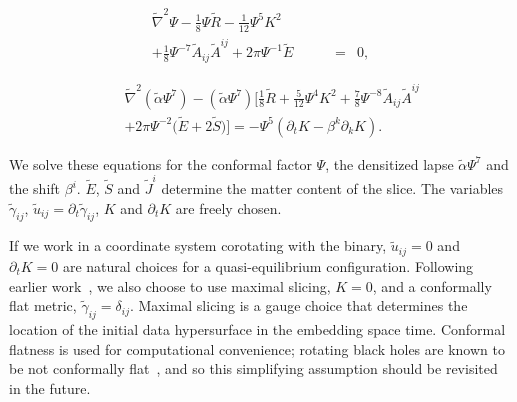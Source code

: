 {\begin{eqnarray}
\tilde{\nabla}^2\Psi - \frac{1}{8}\Psi\tilde{R} -
\frac{1}{12}\Psi^5K^2  \qquad\quad && \nonumber \\
\label{eq:XCTS-ConformalFactor}
+\frac{1}{8}\Psi^{-7}\tilde{A}_{ij}\tilde{A}^{ij} +
2\pi\Psi^{-1}\tilde{E} &=& 0,
\end{eqnarray}

\begin{eqnarray}
&&\tilde{\nabla}^2\left(\tilde{\alpha}\Psi^7\right) -
\left(\tilde{\alpha}\Psi^7\right)\bigg[\frac{1}{8}\tilde{R}+\frac{5}{12}\Psi^4K^2+\frac{7}{8}\Psi^{-8}\tilde{A}_{ij}\tilde{A}^{ij}\nonumber \\
\label{eq:XCTS-Lapse}
&&+2\pi\Psi^{-2}\big(\tilde{E}+2\tilde{S}\big)\bigg]=-\Psi^5\left(\partial_{t}K
- \beta^{k}\partial_kK\right).
\end{eqnarray}

We solve these equations for the conformal factor $\Psi$, the
densitized lapse $\tilde\alpha\Psi^7$ and the shift $\beta^i$. $\tilde{E}$,
$\tilde{S}$ and $\tilde{J}^i$ determine the matter content of the
slice. The variables $\tilde{\gamma}_{ij}$, $\tilde{u}_{ij} =
\partial_t\tilde{\gamma}_{ij}$, $K$ and $\partial_t K$ are freely
chosen.

  If we work in a coordinate system corotating with the binary,
  $\tilde{u}_{ij} = 0$ and $\partial_t K = 0$ are natural choices for
  a quasi-equilibrium configuration. Following earlier work~\cite{Taniguchi2007,TaniguchiEtAl:2006,FoucartEtAl:2008}, we also choose to
  use maximal slicing, $K=0$, and a conformally flat metric,
  $\tilde{\gamma}_{ij}=\delta_{ij}$.  
  Maximal slicing is a gauge choice that determines the
    location of the initial data hypersurface in the embedding space
    time.  Conformal flatness is used for computational convenience;
    rotating black holes are known to be not conformally
    flat~\cite{GaratPrice:2000}, and so this simplifying assumption should be revisited in the future.

}
